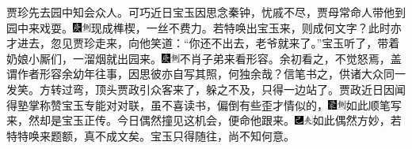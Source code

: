 贾珍先去园中知会众人。可巧近日宝玉因思念秦钟，忧戚不尽，贾母常命人带他到园中来戏耍。{\includegraphics[width=3mm]{../Images/00004}\includegraphics[width=3mm]{../Images/00011}\footnotesize \kaishu 现成榫楔，一丝不费力。若特唤出宝玉来，则成何文字？}此时亦才进去，忽见贾珍走来，向他笑道：“你还不出去，老爷就来了。”宝玉听了，带着奶娘小厮们，一溜烟就出园来。{\includegraphics[width=3mm]{../Images/00004}\includegraphics[width=3mm]{../Images/00011}\footnotesize \kaishu 不肖子弟来看形容。余初看之，不觉怒焉，盖谓作者形容余幼年往事，因思彼亦自写其照，何独余哉？信笔书之，供诸大众同一发笑。}方转过弯，顶头贾政引众客来了，躲之不及，只得一边站了。贾政近日因闻得塾掌称赞宝玉专能对对联，虽不喜读书，偏倒有些歪才情似的，{\includegraphics[width=3mm]{../Images/00006}\includegraphics[width=3mm]{../Images/00011}\footnotesize \kaishu 如此顺笔写来，然却是宝玉正传。}今日偶然撞见这机会，便命他跟来。{\includegraphics[width=3mm]{../Images/00003}\includegraphics[width=3mm]{../Images/00012}\footnotesize \kaishu 如此偶然方妙，若特特唤来题额，真不成文矣。}宝玉只得随往，尚不知何意。

